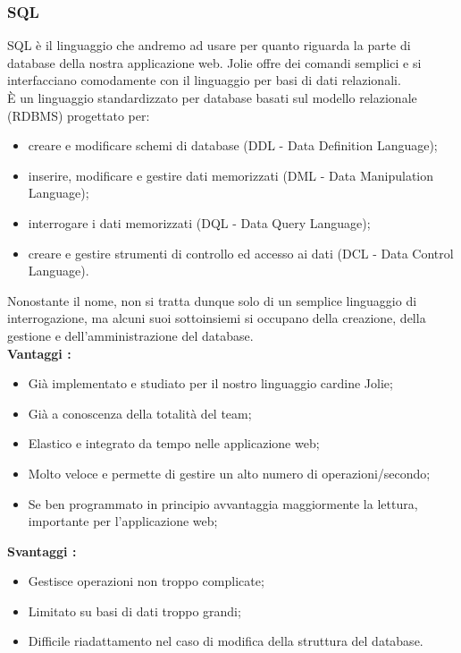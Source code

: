 {{		\subsubsection{SQL}{
			SQL è il linguaggio che andremo ad usare per quanto riguarda la parte di database della nostra applicazione web. Jolie offre dei comandi semplici e si interfacciano comodamente con il linguaggio per basi di dati relazionali.\\
			È un linguaggio standardizzato per database basati sul modello relazionale (RDBMS) progettato per:
			\begin{itemize}
				\item creare e modificare schemi di database (DDL - Data Definition Language);
				\item inserire, modificare e gestire dati memorizzati (DML - Data Manipulation Language);
				\item interrogare i dati memorizzati (DQL - Data Query Language);
				\item creare e gestire strumenti di controllo ed accesso ai dati (DCL - Data Control Language).
			\end{itemize}
			Nonostante il nome, non si tratta dunque solo di un semplice linguaggio di interrogazione, ma alcuni suoi sottoinsiemi si occupano della creazione, della gestione e dell'amministrazione del database.\\
			\textbf{Vantaggi :}
			\begin{itemize}\itemsep1pt
				\item Già implementato e studiato per il nostro linguaggio cardine Jolie;
				\item Già a conoscenza della totalità del team;
				\item Elastico e integrato da tempo nelle applicazione web;
				\item Molto veloce e permette di gestire un alto numero di operazioni/secondo;
				\item Se ben programmato in principio avvantaggia maggiormente la lettura, importante per l'applicazione web;
				
			\end{itemize}
			\textbf{Svantaggi :}
			\begin{itemize}\itemsep1pt
				\item Gestisce operazioni non troppo complicate;
				\item Limitato su basi di dati troppo grandi;
				\item Difficile riadattamento nel caso di modifica della struttura del database.
			\end{itemize}
		}
	}
}
